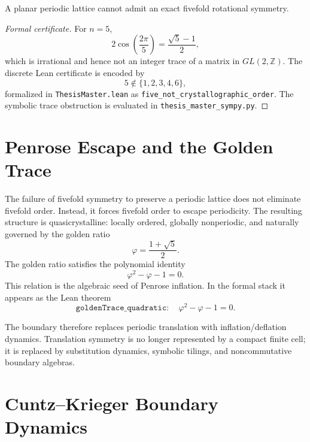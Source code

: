 \begin{theorem}
A planar periodic lattice cannot admit an exact fivefold rotational symmetry.
\end{theorem}

\begin{proof}[Formal certificate]
For $n=5$,
\begin{equation}
    2\cos\left(\frac{2\pi}{5}\right)=\frac{\sqrt{5}-1}{2},
\end{equation}
which is irrational and hence not an integer trace of a matrix in $GL(2,\mathbb{Z})$.  The discrete Lean certificate is encoded by
\begin{equation}
    5\notin\{1,2,3,4,6\},
\end{equation}
formalized in \texttt{ThesisMaster.lean} as \texttt{five\_not\_crystallographic\_order}.  The symbolic trace obstruction is evaluated in \texttt{thesis\_master\_sympy.py}.
\end{proof}

\section{Penrose Escape and the Golden Trace}

The failure of fivefold symmetry to preserve a periodic lattice does not eliminate fivefold order.  Instead, it forces fivefold order to escape periodicity.  The resulting structure is quasicrystalline: locally ordered, globally nonperiodic, and naturally governed by the golden ratio
\begin{equation}
    \varphi=\frac{1+\sqrt{5}}{2}.
\end{equation}
The golden ratio satisfies the polynomial identity
\begin{equation}
    \varphi^2-\varphi-1=0.
\end{equation}
This relation is the algebraic seed of Penrose inflation.  In the formal stack it appears as the Lean theorem
\begin{equation}
    \texttt{goldenTrace\_quadratic}:
    \quad \varphi^2-\varphi-1=0.
\end{equation}

The boundary therefore replaces periodic translation with inflation/deflation dynamics.  Translation symmetry is no longer represented by a compact finite cell; it is replaced by substitution dynamics, symbolic tilings, and noncommutative boundary algebras.

\section{Cuntz--Krieger Boundary Dynamics}


